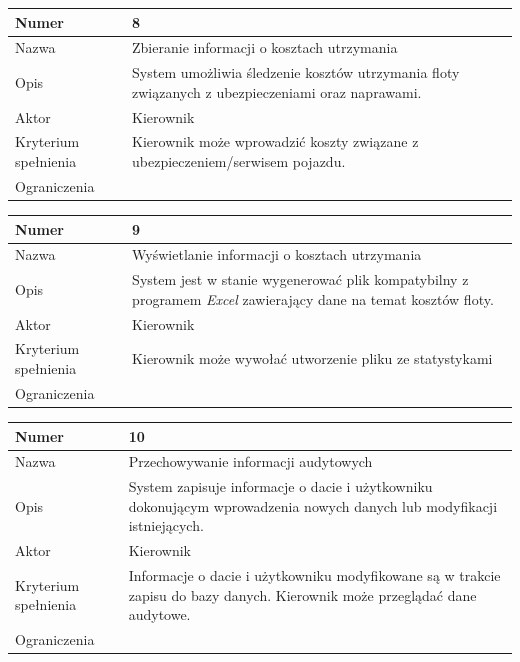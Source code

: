 \documentclass[eng,printmode,openany]{mgr}
\begin{document}
	\begin{table}[H]
		\begin{tabularx}{\textwidth}{|l|X|}
			\hline
			Numer                & 8 \\ \hline
			Nazwa                & Zbieranie informacji o kosztach utrzymania \\ \hline
			Opis                 & System umożliwia śledzenie kosztów utrzymania floty związanych z ubezpieczeniami oraz naprawami. \\ \hline
			Aktor                & Kierownik \\ \hline
			Kryterium spełnienia & Kierownik może wprowadzić koszty związane z ubezpieczeniem/serwisem pojazdu. \\ \hline
			Ograniczenia         & \\ \hline
		\end{tabularx}
	\end{table}
	
	\begin{table}[H]
		\begin{tabularx}{\textwidth}{|l|X|}
			\hline
			Numer                & 9 \\ \hline
			Nazwa                & Wyświetlanie informacji o kosztach utrzymania \\ \hline
			Opis                 & System jest w stanie wygenerować plik kompatybilny z programem \textit{Excel} zawierający dane na temat kosztów floty. \\ \hline
			Aktor                & Kierownik \\ \hline
			Kryterium spełnienia & Kierownik może wywołać utworzenie pliku ze statystykami  \\ \hline
			Ograniczenia         & \\ \hline
		\end{tabularx}
	\end{table}
	
	\begin{table}[H]
		\begin{tabularx}{\textwidth}{|l|X|}
			\hline
			Numer                & 10 \\ \hline
			Nazwa                & Przechowywanie informacji audytowych \\ \hline
			Opis                 & System zapisuje informacje o dacie i użytkowniku dokonującym wprowadzenia nowych danych lub modyfikacji istniejących. \\ \hline
			Aktor                & Kierownik \\ \hline
			Kryterium spełnienia & Informacje o dacie i użytkowniku modyfikowane są w trakcie zapisu do bazy danych. Kierownik może przeglądać dane audytowe.  \\ \hline
			Ograniczenia         & \\ \hline
		\end{tabularx}
	\end{table}
	
\end{document}
